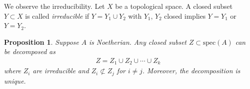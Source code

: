 \documentclass[12pt]{report}
\theoremstyle{plain}
\newtheorem{proposition}[theorem]{Proposition}
\theoremstyle{remark}
\theoremstyle{definition}
\begin{document}
We observe the irreducibility. Let $X$ be a topological space. A closed subset $Y\subset X$ is called \emph{irreducible} if $Y=Y_1\cup Y_2$ with $Y_1$, $Y_2$ closed implies $Y=Y_1$ or $Y=Y_2$.

\begin{proposition}
    Suppose $A$ is Noetherian. Any closed subset $Z\subset\mathrm{spec}(A)$ can be decomposed as
    \begin{align*}
        Z=Z_1\cup Z_2\cup\cdots\cup Z_k
    \end{align*}
    where $Z_i$ are irreducible and $Z_i\not\subset Z_j$ for $i\neq j$. Moreover, the decomposition is unique.
\end{proposition}




\nocite{*}
\end{document}
